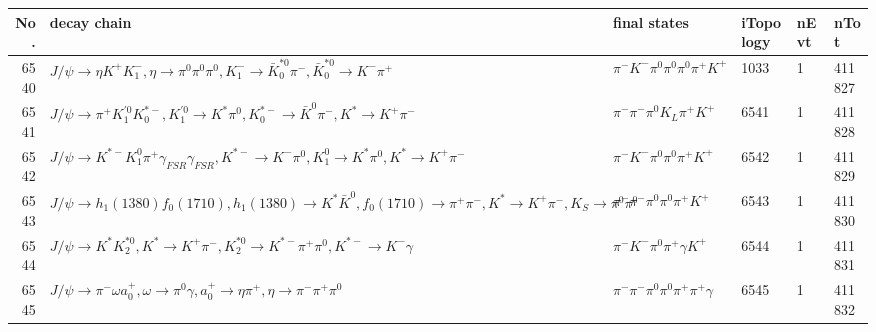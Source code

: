 \begin{table}[htbp] 
\begin{center}
\begin{small}
\begin{tabular}{rlllll}\hline\hline
 No. & decay chain & final states &  iTopology & nEvt & nTot \\\hline
6540&$J/\psi       \rightarrow \eta          K^{+}          K_{1}^{-}      , \eta           \rightarrow \pi^{0}        \pi^{0}        \pi^{0}        , K_{1}^{-}       \rightarrow \bar{K}_0^{*0}\pi^{-}        , \bar{K}_0^{*0} \rightarrow K^{-}          \pi^{+}        $&$\pi^{-}        K^{-}          \pi^{0}        \pi^{0}        \pi^{0}        \pi^{+}        K^{+}          $& 1033&    1&411827\\
6541&$J/\psi       \rightarrow \pi^{+}        K_1^{'0}      K_{0}^{*-}     , K_1^{'0}       \rightarrow K^{*}          \pi^{0}        , K_{0}^{*-}      \rightarrow \bar{K}^{0}   \pi^{-}        , K^{*}           \rightarrow K^{+}          \pi^{-}        $&$\pi^{-}        \pi^{-}        \pi^{0}        K_{L}          \pi^{+}        K^{+}          $& 6541&    1&411828\\
6542&$J/\psi       \rightarrow K^{*-}         K_1^{0}        \pi^{+}        \gamma_{FSR} \gamma_{FSR} , K^{*-}          \rightarrow K^{-}          \pi^{0}        , K_1^{0}         \rightarrow K^{*}          \pi^{0}        , K^{*}           \rightarrow K^{+}          \pi^{-}        $&$\pi^{-}        K^{-}          \pi^{0}        \pi^{0}        \pi^{+}        K^{+}          $& 6542&    1&411829\\
6543&$J/\psi       \rightarrow h_{1}(1380)    f_{0}(1710)    , h_{1}(1380)     \rightarrow K^{*}          \bar{K}^{0}   , f_{0}(1710)     \rightarrow \pi^{+}        \pi^{-}        , K^{*}           \rightarrow K^{+}          \pi^{-}        , K_{S}           \rightarrow \pi^{0}        \pi^{0}        $&$\pi^{-}        \pi^{-}        \pi^{0}        \pi^{0}        \pi^{+}        K^{+}          $& 6543&    1&411830\\
6544&$J/\psi       \rightarrow K^{*}          K_2^{*0}       , K^{*}           \rightarrow K^{+}          \pi^{-}        , K_2^{*0}        \rightarrow K^{*-}         \pi^{+}        \pi^{0}        , K^{*-}          \rightarrow K^{-}          \gamma       $&$\pi^{-}        K^{-}          \pi^{0}        \pi^{+}        \gamma       K^{+}          $& 6544&    1&411831\\
6545&$J/\psi       \rightarrow \pi^{-}        \omega         a_{0}^{+}      , \omega          \rightarrow \pi^{0}        \gamma       , a_{0}^{+}       \rightarrow \eta          \pi^{+}        , \eta           \rightarrow \pi^{-}        \pi^{+}        \pi^{0}        $&$\pi^{-}        \pi^{-}        \pi^{0}        \pi^{0}        \pi^{+}        \pi^{+}        \gamma       $& 6545&    1&411832\\

\end{tabular}
\end{small}
\end{center}
\end{table}
